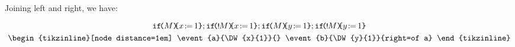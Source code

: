 \begin{scope}
\begin{scope}
\begin{align*}
    \end{align*}
  \end{scope}
  Joining left and right, we have:
  \begin{scope}
    \footnotesize
    \begin{align*}
      \begin{gathered}
        \IF{\aExp}\THEN\PW{x}{1}\FI
        \SEMI
        \IF{\BANG\aExp}\THEN\PW{x}{1}\FI
        \SEMI
        \IF{\aExp}\THEN\PW{y}{1}\FI
        \SEMI
        \IF{\BANG\aExp}\THEN\PW{y}{1}\FI
        \\
        \hbox{\begin{tikzinline}[node distance=1em]
            \event{a}{\DW{x}{1}}{}
            \event{b}{\DW{y}{1}}{right=of a}
          \end{tikzinline}}
      \end{gathered}
    \end{align*}
  \end{scope}  
\end{scope}

